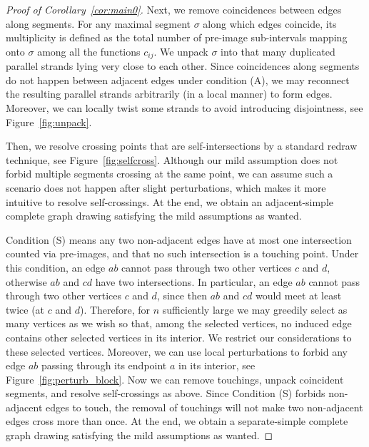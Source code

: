 \documentclass[a4paper,UKenglish,cleveref, autoref, thm-restate]{lipics_arxiv}
\begin{document}
\begin{proof}[Proof of Corollary~\ref{cor:main0}]
Next, we remove coincidences between edges along segments. For any maximal segment $\sigma$ along which edges coincide, its multiplicity is defined as the total number of pre-image sub-intervals mapping onto $\sigma$ among all the functions $c_{ij}$. We unpack $\sigma$ into that many duplicated parallel strands lying very close to each other. Since coincidences along segments do not happen between adjacent edges under condition (A), we may reconnect the resulting parallel strands arbitrarily (in a local manner) to form edges. Moreover, we can locally twist some strands to avoid introducing disjointness, see Figure~\ref{fig:unpack}.

Then, we resolve crossing points that are self-intersections by a standard redraw technique, see Figure~\ref{fig:selfcross}. Although our mild assumption does not forbid multiple segments crossing at the same point, we can assume such a scenario does not happen after slight perturbations, which makes it more intuitive to resolve self-crossings. At the end, we obtain an adjacent-simple complete graph drawing satisfying the mild assumptions as wanted.

Condition (S) means any two non-adjacent edges have at most one intersection counted via pre-images, and that no such intersection is a touching point. Under this condition, an edge $ab$ cannot pass through two other vertices $c$ and $d$, otherwise $ab$ and $cd$ have two intersections. In particular, an edge $ab$ cannot pass through two other vertices $c$ and $d$, since then $ab$ and $cd$ would meet at least twice (at $c$ and $d$). Therefore, for $n$ sufficiently large we may greedily select as many vertices as we wish so that, among the selected vertices, no induced edge contains other selected vertices in its interior. We restrict our considerations to these selected vertices. Moreover, we can use local perturbations to forbid any edge $ab$ passing through its endpoint $a$ in its interior, see Figure~\ref{fig:perturb_block}. Now we can remove touchings, unpack coincident segments, and resolve self-crossings as above. Since Condition (S) forbids non-adjacent edges to touch, the removal of touchings will not make two non-adjacent edges cross more than once. At the end, we obtain a separate-simple complete graph drawing satisfying the mild assumptions as wanted.


\end{proof}
\end{document}
